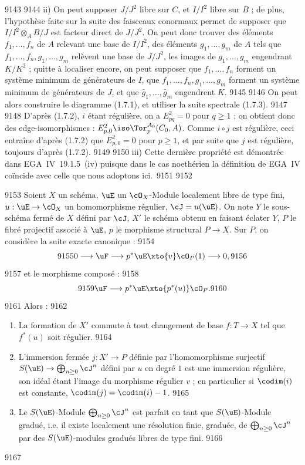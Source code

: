  9143	
  9144	ii) On peut supposer $J/J^2$ libre sur $C$, et $I/I^2$ libre sur $B$ ; de plus, l'hypoth\`ese faite sur la suite des faisceaux conormaux permet de supposer que $I/I^2 \otimes_A B/J$ est facteur direct de $J/J^2$. On peut donc trouver des \'el\'ements $f_1,\dots,f_n$ de $A$ relevant une base de $I/I^2$, des \'el\'ements $g_1,\dots,g_m$ de $A$ tels que $f_1,\dots,f_n,g_1,\dots,g_m$ rel\`event une base de $J/J^2$, les images de $g_1,\dots,g_m$ engendrant $K/K^2$ ; quitte \`a localiser encore, on peut supposer que $f_1,\dots,f_n$ forment un syst\`eme minimum de g\'en\'erateurs de $I$, que $f_1,\dots,f_n,g_1,\dots,g_m$ forment un syst\`eme minimum de g\'en\'erateurs de $J$, et que $\bar{g}_1,\dots,\bar{g}_m$ engendrent $K$.
  9145	
  9146	On peut alors construire le diagramme (1.7.1), et utiliser la suite spectrale (1.7.3).
  9147	
  9148	D'apr\`es (1.7.2), $i$ \'etant r\'eguli\`ere, on a $E^2_{pq} = 0$ pour $q \geq 1$ ; on obtient donc des edge-isomorphismes : $E^2_{p,0} \iso \Tor_p^{A_0}(C_0, A)$. Comme $i \circ j$ est r\'eguli\`ere, ceci entra\^ine d'apr\`es (1.7.2) que $E^2_{p,0} = 0$ pour $p \geq 1$, et par suite que $j$ est r\'eguli\`ere, toujours d'apr\`es (1.7.2).
  9149	
  9150	iii) Cette derni\`ere propri\'et\'e est d\'emontr\'ee dans EGA~IV~19.1.5~(iv) puisque dans le cas noeth\'erien la d\'efinition de EGA~IV co\"incide avec celle que nous adoptons ici.\
  9151	
  9152	\begin{proposition}[1.8]
  9153	Soient $X$ un sch\'ema, $\uE$ un $\cO_X$-Module localement libre de type fini, $u: \uE \to \cO_X$ un homomorphisme r\'egulier, $\cJ = u(\uE)$. On note $Y$ le sous-sch\'ema ferm\'e de $X$ d\'efini par $\cJ$, $X'$ le sch\'ema obtenu en faisant \'eclater $Y$, $P$ le fibr\'e projectif associ\'e \`a $\uE$, $p$ le morphisme structural $P \to X$. Sur $P$, on consid\`ere la suite exacte canonique :
  9154	\[
  9155	0 \longrightarrow \uF \longrightarrow p^{*}\uE \xto{v} \cO_P(1) \longrightarrow 0,
  9156	\]
  9157	et le morphisme compos\'e :
  9158	\[
  9159	\uF \longrightarrow p^{*}\uE \xto{p^{*}(u)} \cO_P.
  9160	\]
  9161	Alors :
  9162	\begin{enumerate}[label=\roman*)]
  9163	\item La formation de $X'$ commute \`a tout changement de base $f: T \to X$ tel que $f^{*}(u)$ soit r\'egulier.
  9164	\item L'immersion ferm\'ee $j: X' \to P$ d\'efinie par l'homomorphisme surjectif $S(\uE) \to \bigoplus_{n \geq 0} \cJ^n$ d\'efini par $u$ en degr\'e $1$ est une immersion r\'eguli\`ere, son id\'eal \'etant l'image du morphisme r\'egulier $v$ ; en particulier si $\codim(i)$ est constante, $\codim(j) = \codim(i) - 1$.
  9165	\item Le $S(\uE)$-Module $\bigoplus_{n \geq 0} \cJ^n$ est parfait en tant que $S(\uE)$-Module gradu\'e, i.e. il existe localement une r\'esolution finie, gradu\'ee, de $\bigoplus_{n \geq 0} \cJ^n$ par des $S(\uE)$-modules gradu\'es libres de type fini.
  9166	\end{enumerate}
  9167	\end{proposition}
